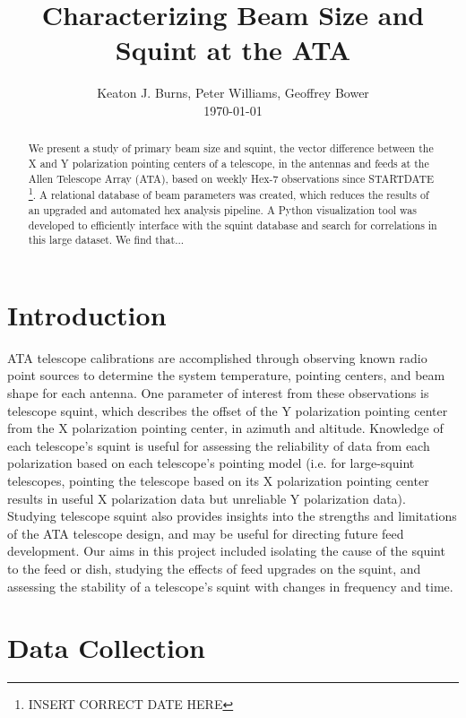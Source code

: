 \documentclass[preprint]{aastex}
\begin{document}
\title{Characterizing Beam Size and Squint at the ATA}
\author{Keaton J. Burns, Peter Williams, Geoffrey Bower \\ \today}

\begin{abstract}
We present a study of primary beam size and squint, the vector
difference between the X and Y polarization pointing centers of a
telescope, in the antennas and feeds at the Allen Telescope Array
(ATA), based on weekly Hex-7 observations since
STARTDATE \footnote{INSERT CORRECT DATE HERE}.  A relational database
of beam parameters was created, which reduces the results of an
upgraded and automated hex analysis pipeline.  A Python visualization
tool was developed to efficiently interface with the squint database
and search for correlations in this large dataset.  We find that...
\end{abstract}

%
%

\tableofcontents

\section{Introduction}\label{s.intro}
ATA telescope calibrations are accomplished through observing known
radio point sources to determine the system temperature, pointing
centers, and beam shape for each antenna.  One parameter of interest
from these observations is telescope squint, which describes the
offset of the Y polarization pointing center from the X polarization
pointing center, in azimuth and altitude.  Knowledge of each
telescope's squint is useful for assessing the reliability of data
from each polarization based on each telescope's pointing model
(i.e. for large-squint telescopes, pointing the telescope based on its
X polarization pointing center results in useful X polarization data
but unreliable Y polarization data). Studying telescope squint also
provides insights into the strengths and limitations of the ATA
telescope design, and may be useful for directing future feed
development.  Our aims in this project included isolating the cause of
the squint to the feed or dish, studying the effects of feed upgrades
on the squint, and assessing the stability of a telescope's squint
with changes in frequency and time.

\section{Data Collection}\label{s.datacollection}
\end{document}
